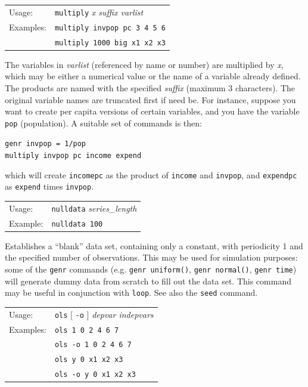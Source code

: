 \documentclass{article}
\begin{document}
{

\begin{tabular}{ll}
Usage:    &     \texttt{multiply} \textit{x suffix varlist}\\
Examples:  &    \texttt{multiply invpop pc 3 4 5 6}\\
           &    \texttt{multiply 1000 big x1 x2 x3}
\end{tabular}

The variables in \textit{varlist} (referenced by name or number) are
multiplied by \textit{x}, which may be either a numerical value or the
name of a variable already defined.  The products are named with the
specified \textit{suffix} (maximum 3 characters).  The original
variable names are truncated first if need be.  For instance, suppose
you want to create per capita versions of certain variables, and you
have the variable \texttt{pop} (population).  A suitable set of
commands is then:

  \texttt{genr invpop = 1/pop} \\
  \texttt{multiply invpop pc income expend} 
  
which will create \texttt{incomepc} as the product of
  \texttt{income} and \texttt{invpop}, and \texttt{expendpc} as
  \texttt{expend} times \texttt{invpop}.


\begin{tabular}{ll}
Usage:     &    \texttt{nulldata} \textit{series\_length}\\
Example:   &    \texttt{nulldata 100}
\end{tabular}

Establishes a ``blank'' data set, containing only a constant, with
periodicity 1 and the specified number of observations.  This may be
used for simulation purposes: some of the \texttt{genr} commands (e.g.
\texttt{genr uniform()}, \texttt{genr normal()}, \texttt{genr time})
will generate dummy data from scratch to fill out the data set.  This
command may be useful in conjunction with \texttt{loop}.  See also the
\texttt{seed} command.


\begin{tabular}{ll}
Usage:  &  \texttt{ols} [ \texttt{-o} ] \textit{depvar indepvars}  \\
Examples: &      \texttt{ols 1 0 2 4 6 7}  \\
          &      \texttt{ols -o 1 0 2 4 6 7} \\
          &      \texttt{ols y 0 x1 x2 x3}  \\
          &      \texttt{ols -o y 0 x1 x2 x3} \\
\end{tabular}                

}
\end{document}
